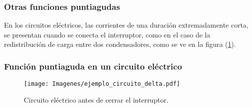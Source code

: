 \documentclass[12pt]{beamer}
\begin{document}
\begin{frame}
\frametitle{Otras funciones puntiagudas}
En los circuitos eléctricos, las corrientes  de una duración extremadamente corta, \pause se presentan cuando se conecta el interruptor, como en el caso de la redistribución de carga entre dos condensadores, como se ve en la figura (\ref{fig_figura_delta_Dirac_04}).
\end{frame}
\begin{frame}
\frametitle{Función puntiaguda en un circuito eléctrico}
\begin{figure}[H]
    \centering
    \texttt{[image: Imagenes/ejemplo\_circuito\_delta.pdf]}
    \caption{Circuito eléctrico antes de cerrar el interruptor.}
    \label{fig_figura_delta_Dirac_04}
\end{figure}
\end{frame}




\end{document}
